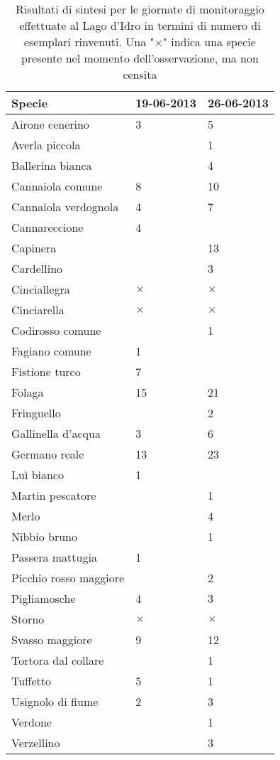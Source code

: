 \documentclass[11pt,a4paper,twoside]{memoir}
\begin{document}
\begin{table}[H]
\centering
\begin{tabular}{lll}
\toprule
    \textbf{  Specie  } & \textbf{  19-06-2013  } & \textbf{  26-06-2013 } \\
\midrule
      Airone cenerino & 3 & 5 \\
      Averla piccola  &   & 1 \\
      Ballerina bianca  &   & 4 \\
      Cannaiola comune  & 8 & 10  \\
      Cannaiola verdognola  & 4 & 7 \\
      Cannareccione & 4 &   \\
      Capinera  &   & 13  \\
      Cardellino  &   & 3 \\
      Cinciallegra  & $\times$ & $\times$ \\
      Cinciarella & $\times$ & $\times$ \\
      Codirosso comune  &   & 1 \\
      Fagiano comune  & 1 &   \\
      Fistione turco  & 7 &   \\
      Folaga  & 15  & 21  \\
      Fringuello  &   & 2 \\
      Gallinella d'acqua  & 3 & 6 \\
      Germano reale & 13  & 23  \\
      Luì bianco  & 1 &   \\
      Martin pescatore  &   & 1 \\
      Merlo &   & 4 \\
      Nibbio bruno  &   & 1 \\
      Passera mattugia  & 1 &   \\
      Picchio rosso maggiore  &   & 2 \\
      Pigliamosche  & 4 & 3 \\
      Storno  & $\times$ & $\times$ \\
      Svasso maggiore & 9 & 12  \\
      Tortora dal collare &   & 1 \\
      Tuffetto  & 5 & 1 \\
      Usignolo di fiume & 2 & 3 \\
      Verdone &   & 1 \\
      Verzellino  &   & 3 \\
\bottomrule
\end{tabular}
\caption{Risultati di sintesi per le giornate di monitoraggio effettuate al Lago d'Idro in termini di numero di esemplari rinvenuti. Una "$\times$" indica una specie presente nel momento dell'osservazione, ma non censita}
\end{table}
\end{document}
